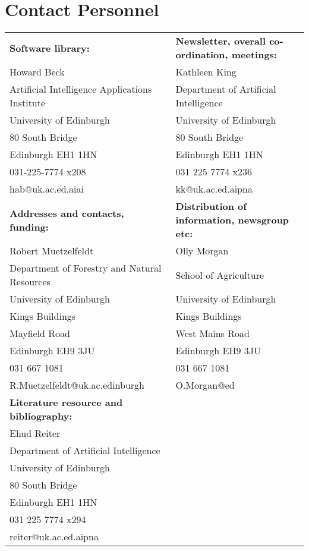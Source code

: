 \section{Contact Personnel}
\begin{tabular}{l|l}
{\bf Software library:} & {\bf Newsletter, overall co-ordination,
meetings:}\\ 
Howard Beck &  Kathleen King\\
Artificial Intelligence Applications Institute &  Department of
Artificial Intelligence \\
University of Edinburgh & University of Edinburgh\\
80 South Bridge & 80 South Bridge\\
Edinburgh EH1 1HN & Edinburgh EH1 1HN\\
031-225-7774 x208 & 031 225 7774 x236\\
hab@uk.ac.ed.aiai & kk@uk.ac.ed.aipna\\
\hline
{\bf Addresses and contacts, funding:} & {\bf Distribution of
information, newsgroup etc:}\\ 
Robert Muetzelfeldt & Olly Morgan\\
Department of Forestry and Natural Resources &  School of Agriculture\\
University of Edinburgh & University of Edinburgh\\
Kings Buildings & Kings Buildings\\
 Mayfield Road &  West Mains Road\\
Edinburgh   EH9 3JU & Edinburgh   EH9 3JU\\
 031 667 1081 & 031 667 1081\\
 R.Muetzelfeldt@uk.ac.edinburgh &  O.Morgan@ed\\
\hline
{\bf Literature resource and bibliography:} &\\
 Ehud Reiter &\\
 Department of Artificial Intelligence &\\
 University of Edinburgh &\\
 80 South Bridge &\\
 Edinburgh EH1 1HN &\\
 031 225 7774 x294 &\\
reiter@uk.ac.ed.aipna &


\end{tabular}





